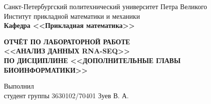 \documentclass[main.tex]{subfiles}
\begin{document}
\begin{titlepage}
\begin{center}
	\begin{large}
		Санкт-Петербургский политехнический университет Петра Великого\\
		Институт прикладной математики и механики\\
		\textbf{Кафедра <<Прикладная математика>>}\\
	\end{large}
	\vfill
	\Large{\textbf{ОТЧЁТ ПО ЛАБОРАТОРНОЙ РАБОТЕ\\
	<<АНАЛИЗ ДАННЫХ RNA-SEQ>>\\
	ПО ДИСЦИПЛИНЕ <<ДОПОЛНИТЕЛЬНЫЕ ГЛАВЫ БИОИНФОРМАТИКИ>>}}
\end{center}
\vfill
\flushleft
Выполнил\\
студент группы 3630102/70401
\flushright
Зуев В. А.\\
\flushleft
\vfill
{}
\end{titlepage}
\end{document}
